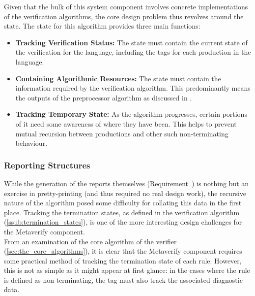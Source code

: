 Given that the bulk of this system component involves concrete implementations of the verification algorithms, the core design problem thus revolves around the state. 
The state for this algorithm provides three main functions:
\begin{itemize}
    \item \textbf{Tracking Verification Status:} The state must contain the current state of the verification for the language, including the tags for each production in the language.
    \item \textbf{Containing Algorithmic Resources:} The state must contain the information required by the verification algorithm.
    This predominantly means the outputs of the preprocessor algorithm as discussed in .
    \item \textbf{Tracking Temporary State:} As the algorithm progresses, certain portions of it need some awareness of where they have been.
    This helps to prevent mutual recursion between productions and other such non-terminating behaviour. 
\end{itemize}


\subsubsection{Reporting Structures} %
\label{ssub:reporting_structures}
While the generation of the reports themselves (Requirement~) is nothing but an exercise in pretty-printing (and thus required no real design work), the recursive nature of the algorithm posed some difficulty for collating this data in the first place. 
Tracking the termination states, as defined in the verification algorithm (\autoref{ssub:termination_states}), is one of the more interesting design challenges for the Metaverify component.\\

From an examination of the core algorithm of the verifier (\autoref{sec:the_core_algorithms}), it is clear that the Metaverify component requires some practical method of tracking the termination state of each rule. 
However, this is not as simple as it might appear at first glance: in the cases where the rule is defined as non-terminating, the tag must also track the associated diagnostic data. \\

